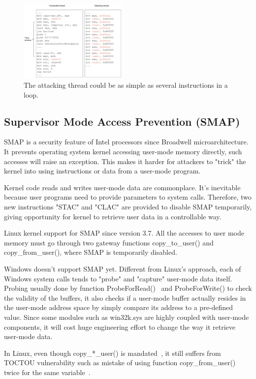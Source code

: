 \begin{figure}[h]
  \includegraphics[width=0.47\textwidth]{figures/toctouasm}
  \centering
  \caption{The attacking thread could be as simple as several instructions in a loop.}
  \label{fig:toctouasm}
\end{figure}


\subsection{Supervisor Mode Access Prevention (SMAP)}
SMAP is a security feature of Intel processors since Broadwell microarchitecture. It prevents operating system kernel accessing user-mode memory directly, such accesses will raise an exception. This makes it harder for attackers to "trick" the kernel into using instructions or data from a user-mode program. 

Kernel code reads and writes user-mode data are commonplace. It's inevitable because user programs need to provide parameters to system calls. Therefore, two new instructions "STAC" and "CLAC" are provided to disable SMAP temporarily, giving opportunity for kernel to retrieve user data in a controllable way.

Linux kernel support for SMAP since version 3.7. All the accesses to user mode memory must go through two gateway functions copy\_to\_user() and copy\_from\_user(), where SMAP is temporarily disabled.

Windows doesn't support SMAP yet. Different from Linux's approach, each of Windows system calls tends to "probe" and "capture" user-mode data itself. Probing usually done by function ProbeForRead()~\cite{probeforread} and ProbeForWrite() to check the validity of the buffers, it also checks if a user-mode buffer actually resides in the user-mode address space by simply compare its address to a pre-defined value. Since some modules such as win32k.sys are highly coupled with user-mode components, it will cost huge engineering effort to change the way it retrieve user-mode data.

In Linux, even though copy\_*\_user() is mandated~\cite{corbet2012linuxsmap}, it still suffers from TOCTOU vulnerability such as mistake of using function copy\_from\_user() twice for the same variable~\cite{double-fetch-linux}. 
